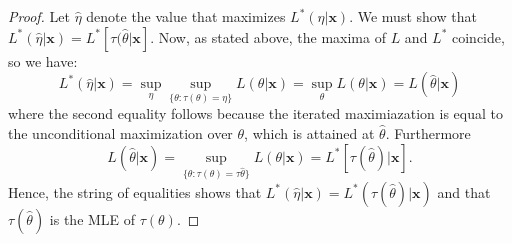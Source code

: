 \documentclass[twoside,11pt]{homework}
\begin{document}
\begin{proof}[Proof]
Let $\hat{\eta}$ denote the value that maximizes $L^*(\eta | \textbf{x})$. We must show that $L^*(\hat{\eta} | \textbf{x})=L^*[\tau(\hat{\theta} | \textbf{x}]$.
Now, as stated above, the maxima of $L$ and $L^*$ coincide, so we have:
\[ L^*(\hat{\eta} | \textbf{x})=\sup_{\eta}\sup_{\{\theta :\tau (\theta)=\eta\}}L(\theta | \textbf{x})=\sup_{\theta} L(\theta | \textbf{x})=L(\hat{\theta} | \textbf{x}) \]
where the second equality follows because the iterated maximiazation is equal to the unconditional maximization over $\theta$, which is attained at $\hat{\theta}$. Furthermore
\[ L(\hat{\theta} | \textbf{x}) = \sup_{\{\theta :\tau (\theta)=\tau{\hat{\theta}}\}} L(\theta | \textbf{x}) = L^*[\tau(\hat{\theta}) | \textbf{x}]. \]
Hence, the string of equalities shows that $L^*(\hat{\eta} | \textbf{x}) = L^*(\tau(\hat{\theta}) | \textbf{x})$ and that $\tau(\hat{\theta})$ is the MLE of $\tau(\theta)$.
\end{proof}
\end{document}
